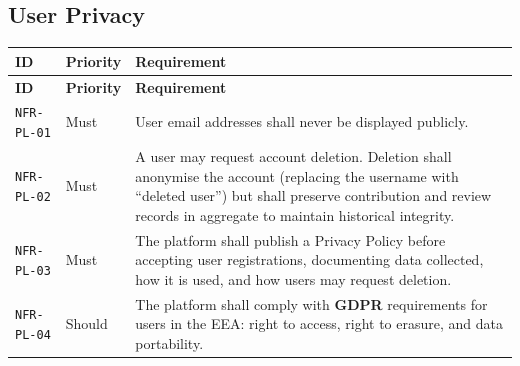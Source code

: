 \documentclass[12pt,a4paper]{article}
\begin{document}
\subsection{User Privacy}
\begin{longtable}{L{2.2cm} L{1.8cm} L{9.3cm}}
  \color{white}\bfseries ID & \color{white}\bfseries Priority & \color{white}\bfseries Requirement \\
  \endfirsthead
  \color{white}\bfseries ID & \color{white}\bfseries Priority & \color{white}\bfseries Requirement \\
  \endhead\hline
  \texttt{NFR-PL-01} & Must   & User email addresses shall never be displayed publicly. \\
  \texttt{NFR-PL-02} & Must   & A user may request account deletion. Deletion shall anonymise the account (replacing the username with ``deleted user'') but shall preserve contribution and review records in aggregate to maintain historical integrity. \\
  \texttt{NFR-PL-03} & Must   & The platform shall publish a Privacy Policy before accepting user registrations, documenting data collected, how it is used, and how users may request deletion. \\
  \texttt{NFR-PL-04} & Should & The platform shall comply with \textbf{GDPR} requirements for users in the EEA: right to access, right to erasure, and data portability. \\
  \hline
\end{longtable}
\end{document}
